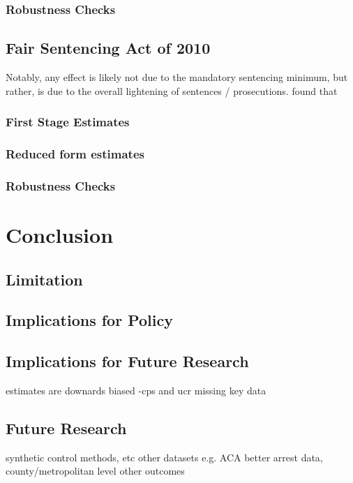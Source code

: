 \documentclass{article}
\begin{document}
\subsubsection{Robustness Checks}

\subsection{Fair Sentencing Act of 2010}

Notably, any effect is likely not due to the mandatory sentencing minimum, but rather, is due to the overall lightening of sentences / prosecutions. \cite{ussc} found that

\subsubsection{First Stage Estimates}

\subsubsection{Reduced form estimates}

\subsubsection{Robustness Checks}

\section{Conclusion}

\subsection{Limitation}

\subsection{Implications for Policy}

\subsection{Implications for Future Research}

estimates are downards biased -cps and ucr missing key data

\subsection{Future Research}
synthetic control methods, etc
other datasets e.g. ACA
better arrest data, county/metropolitan level
other outcomes
\end{document}
